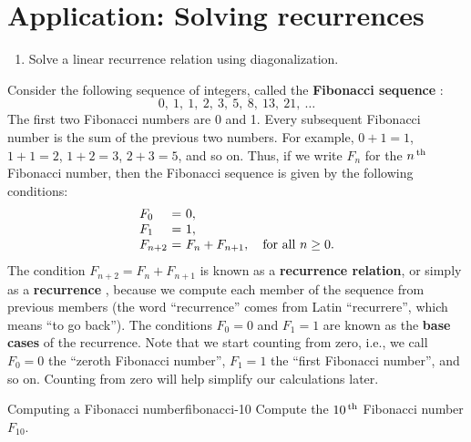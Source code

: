 \section{Application: Solving recurrences}

\begin{outcome}
  \begin{enumerate}
  \item Solve a linear recurrence relation using diagonalization.
  \end{enumerate}
\end{outcome}

Consider the following sequence of integers, called the
\textbf{Fibonacci sequence}%
%
%
:
\begin{equation*}
  0,\ 1,\ 1,\ 2,\ 3,\ 5,\ 8,\ 13,\ 21,\ \ldots
\end{equation*}
The first two Fibonacci numbers are 0 and 1. Every subsequent
Fibonacci number is the sum of the previous two numbers. For example,
$0+1=1$, $1+1=2$, $1+2=3$, $2+3=5$, and so on. Thus, if we write $F_n$ for the
$n^{\,\rm th}$ Fibonacci number, then the Fibonacci sequence is given by the
following conditions:
\begin{equation*}
  \begin{array}{l@{~}c@{~}l}
    F_0 &=& 0, \\
    F_1 &=& 1, \\
    F_{n+2} &=& F_{n} + F_{n+1}, \quad\mbox{for all $n\geq 0$.}\\
  \end{array}
\end{equation*}
The condition $F_{n+2} = F_{n} + F_{n+1}$ is known as a
\textbf{recurrence relation}, or simply as a \textbf{recurrence}%
%
, because we compute each
member of the sequence from previous members (the word ``recurrence''
comes from Latin ``recurrere'', which means ``to go back''). The
conditions $F_0=0$ and $F_1=1$ are known as the \textbf{base cases}%
%
 of the recurrence. Note that we
start counting from zero, i.e., we call $F_0=0$ the ``zeroth Fibonacci
number'', $F_1=1$ the ``first Fibonacci number'', and so on. Counting
from zero will help simplify our calculations later.

\begin{example}{Computing a Fibonacci number}{fibonacci-10}
  Compute the $10^{\,\rm th}$ Fibonacci number $F_{10}$.
\end{example}

